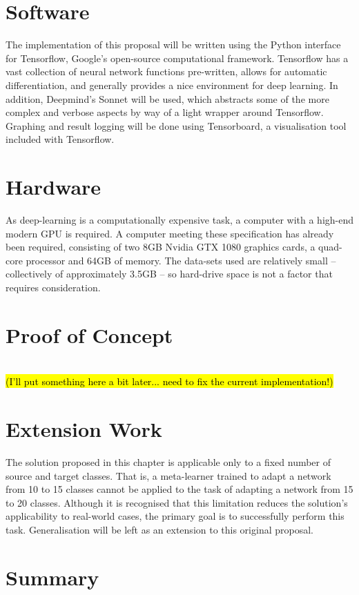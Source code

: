 \documentclass{report}
\newcommand{\TODO}[1]{\sethlcolor{pink}\hl{\\(#1)\\}}
\begin{document}
	
	\section{Software}
	The implementation of this proposal will be written using the Python interface for Tensorflow\parencite{tensorflow}, Google's open-source computational framework. Tensorflow has a vast collection of neural network functions pre-written, allows for automatic differentiation, and generally provides a nice environment for deep learning. In addition, Deepmind's Sonnet\parencite{sonnet} will be used, which abstracts some of the more complex and verbose aspects by way of a light wrapper around Tensorflow. Graphing and result logging will be done using Tensorboard, a visualisation tool included with Tensorflow. \par
	
	\section{Hardware}
	As deep-learning is a computationally expensive task, a computer with a high-end modern GPU is required. A computer meeting these specification has already been required, consisting of two 8GB Nvidia GTX 1080 graphics cards, a quad-core processor and 64GB of memory. The data-sets used are relatively small -- collectively of approximately 3.5GB -- so hard-drive space is not a factor that requires consideration.  \par
	
	\section{Proof of Concept}
	\TODO{I'll put something here a bit later... need to fix the current implementation!}
	
	\section{Extension Work}
	The solution proposed in this chapter is applicable only to a fixed number of source and target classes. That is, a meta-learner trained to adapt a network from 10 to 15 classes cannot be applied to the task of adapting a network from 15 to 20 classes. Although it is recognised that this limitation reduces the solution's applicability to real-world cases, the primary goal is to successfully perform this task. Generalisation will be left as an extension to this original proposal. \par
	
	\section{Summary}	
	

	\printbibliography
	
	
\end{document}
